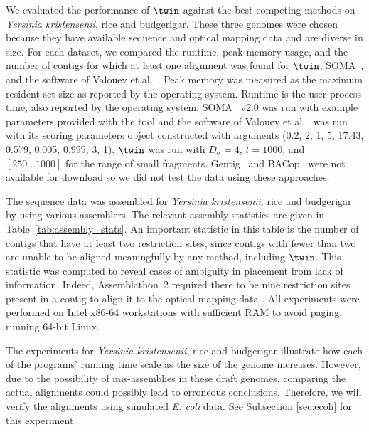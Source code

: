 \documentclass[doctor]{thesis}
\begin{document}
We evaluated the performance of $\twin$ against the best competing methods on \emph{Yersinia kristensenii}, rice and budgerigar.  These three genomes were chosen because they have available sequence and optical mapping data and are diverse in size.   For each dataset, we compared the runtime, peak memory usage, and the number of contigs for which at least one alignment was found for $\twin$, SOMA~\cite{Nagarajan08}, and the software of Valouev et al.~\cite{Valouev06}.  Peak memory was measured as the maximum resident set size as reported by the operating system.  Runtime is the user process time, also reported by the operating system.   SOMA~\cite{Nagarajan08} v2.0 was run with example parameters provided with the tool and the software of Valouev et al.~\cite{Valouev06} was run with its scoring parameters object constructed with arguments (0.2, 2, 1, 5, 17.43, 0.579, 0.005, 0.999, 3, 1). $\twin $ was run with $D_\sigma = 4$, $t = 1000$, and $[250 \ldots 1000]$ for the range of small fragments.
Gentig~\cite{Anantharaman01} and BACop~\cite{Zhou09} were not available for download so we did not test the data using these approaches.      
  
The sequence data was assembled for  \emph{Yersinia kristensenii}, rice and budgerigar by using various assemblers. 
The relevant assembly statistics are given in Table~\ref{tab:assembly_stats}.  An important statistic in this table is the number of contigs that have at least two restriction sites, since contigs with fewer than two are unable to be aligned meaningfully by any method, including $\twin$.  This statistic was computed to reveal cases of ambiguity in placement from lack of information. Indeed, Assemblathon~2 required there to be nine restriction sites present in a contig to align it to the optical mapping data \cite{bradnam2013assemblathon}.  All experiments were performed on Intel x86-64 workstations with sufficient RAM to avoid paging, running  64-bit Linux.

The experiments for \emph{Yersinia kristensenii}, rice and budgerigar illustrate how each of the programs' running time scale as the size of the genome increases.  However, due to the possibility of mis-assemblies in these draft genomes, comparing the actual alignments could possibly lead to erroneous conclusions.  Therefore, we will verify the alignments using simulated {\em E. coli} data.  See Subsection \ref{sec:ecoli} for this experiment.  
\end{document}
